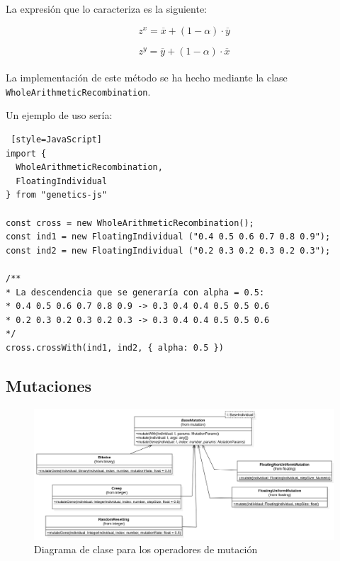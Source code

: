 La expresión que lo caracteriza es la siguiente:

\begin{equation}
    z^x = \overline{x} + (1 - \alpha) \cdot \overline{y}
\end{equation}

\begin{equation}
    z^y = \overline{y} + (1 - \alpha) \cdot \overline{x}
\end{equation}
\\
La implementación de este método se ha hecho mediante la clase \texttt{WholeArithmeticRecombination}. \\

\clearpage

Un ejemplo de uso sería: \\

\begin{lstlisting} [style=JavaScript]
import { 
  WholeArithmeticRecombination, 
  FloatingIndividual 
} from "genetics-js"

const cross = new WholeArithmeticRecombination();
const ind1 = new FloatingIndividual ("0.4 0.5 0.6 0.7 0.8 0.9");
const ind2 = new FloatingIndividual ("0.2 0.3 0.2 0.3 0.2 0.3");

/**
* La descendencia que se generaría con alpha = 0.5:
* 0.4 0.5 0.6 0.7 0.8 0.9 -> 0.3 0.4 0.4 0.5 0.5 0.6
* 0.2 0.3 0.2 0.3 0.2 0.3 -> 0.3 0.4 0.4 0.5 0.5 0.6
*/
cross.crossWith(ind1, ind2, { alpha: 0.5 })
\end{lstlisting}

\subsection{Mutaciones}

\begin{figure}[ht]
    \centering
    \includegraphics[scale=0.4]{mem/images/cap-4/4.2.7(Mutation)/Mutation.png}
    \caption{Diagrama de clase para los operadores de mutación }
    \label{fig:my_label}
\end{figure}

